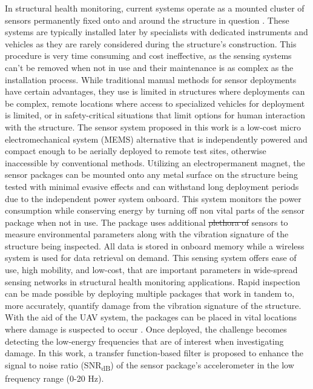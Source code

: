 \documentclass[]{spie}  %
\newcommand{\rd}[1]{\textcolor[rgb]{0.75,0.00,0.00}{#1}}
\begin{document}
	In structural health monitoring, current systems operate as a mounted cluster of sensors permanently fixed onto and around the structure in question \cite{Pakzad2008}. These systems are typically installed later by specialists with dedicated instruments and vehicles as they are rarely considered during the structure's construction. This procedure is very time consuming and cost ineffective, as the sensing systems can’t be removed when not in use and their maintenance is as complex as the installation process. While traditional manual methods for sensor deployments have certain advantages, they use is limited in structures where deployments can be complex, remote locations where access to specialized vehicles for deployment is limited, or in safety-critical situations that limit options for human interaction with the structure. The sensor system proposed in this work is a low-cost micro electromechanical system (MEMS) alternative \cite{Sabato2017} that is independently powered and compact enough to be aerially deployed to remote test sites, otherwise inaccessible by conventional methods. Utilizing an electropermanent magnet, the sensor packages can be mounted onto any metal surface on the structure being tested with minimal evasive effects \cite{Takeuchi2017} and can withstand long deployment periods due to the independent power system onboard. This system monitors the power consumption while conserving energy by turning off non vital parts of the sensor package when not in use. The package uses additional \rd{\st{plethora of}} sensors to measure environmental parameters along with the vibration signature of the structure being inspected. All data is stored in onboard memory while a wireless system is used for data retrieval on demand. This sensing system offers ease of use, high mobility, and low-cost, that are important parameters in wide-spread sensing networks in structural health monitoring applications. Rapid inspection can be made possible by deploying multiple packages that work in tandem to, more accurately, quantify damage from the vibration signature of the structure. With the aid of the UAV system, the packages can be placed in vital locations where damage is suspected to occur \cite{Chen2010}. Once deployed, the challenge becomes detecting the low-energy frequencies that are of interest when investigating damage. In this work, a transfer function-based filter is proposed to enhance the signal to noise ratio (SNR\textsubscript{dB}) of the sensor package’s accelerometer in the low frequency range (0-20 Hz).
	
\end{document}
